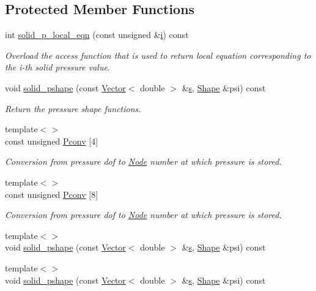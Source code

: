 \subsection*{Protected Member Functions}
\begin{DoxyCompactItemize}
\item 
int \hyperlink{classoomph_1_1QPVDElementWithContinuousPressure_a97a8b3bc51a27731f21b06c1a95aaf45}{solid\+\_\+p\+\_\+local\+\_\+eqn} (const unsigned \&\hyperlink{cfortran_8h_adb50e893b86b3e55e751a42eab3cba82}{i}) const
\begin{DoxyCompactList}\small\item\em Overload the access function that is used to return local equation corresponding to the i-\/th solid pressure value. \end{DoxyCompactList}\item 
void \hyperlink{classoomph_1_1QPVDElementWithContinuousPressure_a917e2f9e3b1bd9ff49d28006e47e438f}{solid\+\_\+pshape} (const \hyperlink{classoomph_1_1Vector}{Vector}$<$ double $>$ \&\hyperlink{cfortran_8h_ab7123126e4885ef647dd9c6e3807a21c}{s}, \hyperlink{classoomph_1_1Shape}{Shape} \&psi) const
\begin{DoxyCompactList}\small\item\em Return the pressure shape functions. \end{DoxyCompactList}\item 
{\footnotesize template$<$$>$ }\\const unsigned \hyperlink{classoomph_1_1QPVDElementWithContinuousPressure_ad9be9df37b37b482608f606f4e0190aa}{Pconv} \mbox{[}4\mbox{]}
\begin{DoxyCompactList}\small\item\em Conversion from pressure dof to \hyperlink{classoomph_1_1Node}{Node} number at which pressure is stored. \end{DoxyCompactList}\item 
{\footnotesize template$<$$>$ }\\const unsigned \hyperlink{classoomph_1_1QPVDElementWithContinuousPressure_af4a484429d02002a102c5b158bd724b8}{Pconv} \mbox{[}8\mbox{]}
\begin{DoxyCompactList}\small\item\em Conversion from pressure dof to \hyperlink{classoomph_1_1Node}{Node} number at which pressure is stored. \end{DoxyCompactList}\item 
{\footnotesize template$<$$>$ }\\void \hyperlink{classoomph_1_1QPVDElementWithContinuousPressure_a1e02992de2dff0a1b9b52eea50c84171}{solid\+\_\+pshape} (const \hyperlink{classoomph_1_1Vector}{Vector}$<$ double $>$ \&\hyperlink{cfortran_8h_ab7123126e4885ef647dd9c6e3807a21c}{s}, \hyperlink{classoomph_1_1Shape}{Shape} \&psi) const
\item 
{\footnotesize template$<$$>$ }\\void \hyperlink{classoomph_1_1QPVDElementWithContinuousPressure_a1a42e35d19a40cb3ce34ab2ef4bc821b}{solid\+\_\+pshape} (const \hyperlink{classoomph_1_1Vector}{Vector}$<$ double $>$ \&\hyperlink{cfortran_8h_ab7123126e4885ef647dd9c6e3807a21c}{s}, \hyperlink{classoomph_1_1Shape}{Shape} \&psi) const
\end{DoxyCompactItemize}
